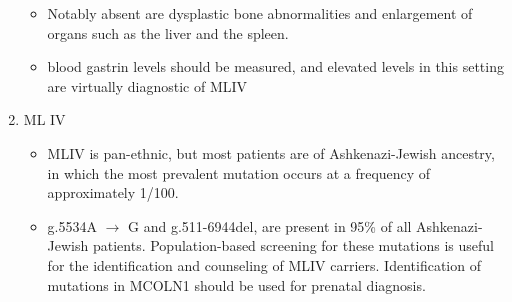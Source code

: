 \documentclass{scrartcl}
\begin{document}
\begin{enumerate}
\begin{itemize}
\item Notably absent are dysplastic bone abnormalities and enlargement of
organs such as the liver and the spleen.

\item blood gastrin levels should be measured, and elevated levels in
this setting are virtually diagnostic of MLIV
\end{itemize}

\item ML IV
\label{sec:org243f435}

\begin{itemize}
\item MLIV is pan-ethnic, but most patients are of Ashkenazi-Jewish
ancestry, in which the most prevalent mutation occurs at a frequency
of approximately 1/100.

\item g.5534A \(\to\) G and g.511-6944del, are present in 95\% of all
Ashkenazi-Jewish patients. Population-based screening for these
mutations is useful for the identification and counseling of MLIV
carriers. Identification of mutations in MCOLN1 should be used for
prenatal diagnosis.
\end{itemize}
\end{enumerate}
\end{document}
